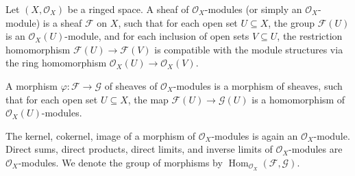 Let $(X, \mathcal{O}_X)$ be a ringed space. A sheaf of $\mathcal{O}_X$-modules (or simply an $\mathcal{O}_X$-module) is a sheaf $\mathcal{F}$ on $X$, such that for each open set $U \subseteq X$, the group $\mathcal{F}(U)$ is an $\mathcal{O}_X(U)$-module, and for each inclusion of open sets $V \subseteq U$, the restriction homomorphism $\mathcal{F}(U) \to \mathcal{F}(V)$ is compatible with the module structures via the ring homomorphism $\mathcal{O}_X(U) \to \mathcal{O}_X(V)$.

A morphism $\varphi: \mathcal{F} \to \mathcal{G}$ of sheaves of $\mathcal{O}_X$-modules is a morphism of sheaves, such that for each open set $U \subseteq X$, the map $\mathcal{F}(U) \to \mathcal{G}(U)$ is a homomorphism of $\mathcal{O}_X(U)$-modules.

The kernel, cokernel, image of a morphism of $\mathcal{O}_X$-modules is again an $\mathcal{O}_X$-module. Direct sums, direct products, direct limits, and inverse limits of $\mathcal{O}_X$-modules are $\mathcal{O}_X$-modules. We denote the group of morphisms by $\operatorname{Hom}_{\mathcal{O}_X}(\mathcal{F}, \mathcal{G})$.
